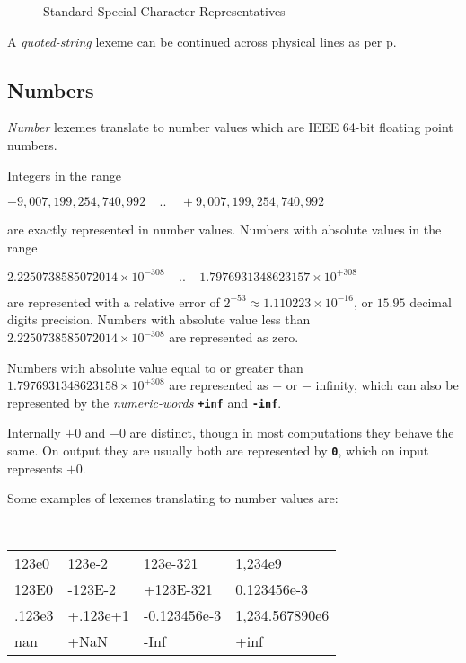 \documentclass[12pt]{article}
\newcommand{\TT}[1]{{\tt \bfseries #1}}
\newcommand{\pagref}[1]{p\pageref{#1}}
\newlength{\figurewidth}
\newenvironment{boxedfigure}[1][!btp]%
	{\begin{figure*}[#1]
	 \begin{lrbox}{\figurebox}
	 \begin{minipage}{\figurewidth}

	 \vspace*{1ex}}%
	{
	 \vspace*{1ex}

	 \end{minipage}
	 \end{lrbox}
	 \begin{center}
	 \fbox{\hspace*{0.1in}\usebox{\figurebox}\hspace*{0.1in}}
	 \end{center}
	 \end{figure*}}
\newenvironment{indpar}[1][0.3in]%
	{\begin{list}{}%
		     {\setlength{\itemsep}{0in}%
		      \setlength{\topsep}{0in}%
		      \setlength{\parsep}{1ex}%
		      \setlength{\labelwidth}{#1}%
		      \setlength{\leftmargin}{#1}%
		      \addtolength{\leftmargin}{\labelsep}}%
	 \item}%
	{\end{list}}
\begin{document}
\begin{boxedfigure}[!t]
\caption{Standard Special Character Representatives}
\label{STANDARD-SPECIAL-CHARACTER-REPRESENTATIVES}
\end{boxedfigure}

A {\em quoted-string} lexeme can be continued across physical lines
as per \pagref{QUOTED-STRING-CONCATENATION}.


\subsection{Numbers}
\label{NUMBERS}

{\em Number} lexemes translate to
number values which are IEEE 64-bit floating point numbers.

Integers in the range
\begin{center}
$-9,007,199,254,740,992~~~~~..~~~~~+9,007,199,254,740,992$
\end{center}
are exactly represented in number values.
Numbers with absolute values in the range
\begin{center}
$2.2250738585072014\times 10^{-308}~~~~~..~~~~~1.7976931348623157\times
                                                               10^{+308}$
\end{center}
are represented with a relative error of
$2^{-53} \approx 1.110223\times 10^{-16}$,
or $15.95$ decimal digits precision.  Numbers
with absolute value less than
$2.2250738585072014\times 10^{-308}$ are represented as zero.

Numbers with absolute value equal to or greater than
$1.7976931348623158\times 10^{+308}$ are represented as $+$ or $-$
infinity, which can also be represented by the {\em numeric-words}
\TT{+inf} and \TT{-inf}.

Internally $+0$ and $-0$ are distinct, though in most computations
they behave the same.  On output they are usually
both are represented by \TT{0}, which on input represents $+0$.

Some examples of lexemes translating to number values are:

\begin{indpar}[0.1in]
\tt
\begin{tabular}{l@{~~~}l@{~~~}l@{~~~}l}
123e0		& 123e-2	& 123e-321	& 1,234e9 \\
123E0		& -123E-2	& +123E-321	& 0.123456e-3	\\
.123e3	& +.123e+1
				& -0.123456e-3 & 1,234.567890e6 \\
nan		& +NaN		& -Inf		& +inf \\
\end{tabular}
\end{indpar}
\end{document}
